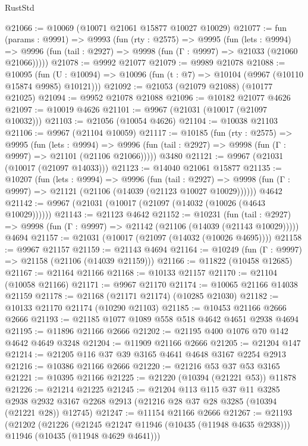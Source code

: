 \begin{lexlean}{RustStd}
\begin{coremodule}
@21066 := @10069 (@10071 @21061 @15877 @10027 @10029)
@21077 := fun (params : @9991) =>
  @9993
    (fun (rty : @2575) =>
    @9995
      (fun (lets : @9994) =>
      @9996 (fun (tail : @2927) => @9998 (fun (Γ : @9997) => @21033 (@21060 @21066)))))
@21078 := @9992 @21077
@21079 := @9989 @21078
@21088 := @10095
    (fun (U : @10094) => @10096 (fun (t : @7) => @10104 (@9967 (@10110 @15874 @9985) @10121)))
@21092 := @21053 (@21079 @21088) (@10177 @21025)
@21094 := @9952 @21078 @21088
@21096 := @10182 @21077 @4626
@21097 := @10019 @4626
@21101 := @9967 (@21031 (@10017 (@21097 @10032)))
@21103 := @21056 (@10054 @4626)
@21104 := @10038 @21103
@21106 := @9967 (@21104 @10059)
@21117 := @10185
    (fun (rty : @2575) =>
    @9995
      (fun (lets : @9994) =>
      @9996 (fun (tail : @2927) => @9998 (fun (Γ : @9997) => @21101 (@21106 @21066)))))
    @3480
@21121 := @9967 (@21031 (@10017 (@21097 @14033)))
@21123 := @14040 @21061 @15877
@21135 := @10207
    (fun (lets : @9994) =>
    @9996
      (fun (tail : @2927) =>
      @9998 (fun (Γ : @9997) => @21121 (@21106 (@14039 (@21123 @10027 @10029))))))
    @4642
@21142 := @9967 (@21031 (@10017 (@21097 (@14032 (@10026 (@4643 @10029))))))
@21143 := @21123 @4642
@21152 := @10231
    (fun (tail : @2927) => @9998 (fun (Γ : @9997) => @21142 (@21106 (@14039 (@21143 @10029)))))
    @4694
@21157 := @21031 (@10017 (@21097 (@14032 (@10026 @4695))))
@21158 := @9967 @21157
@21159 := @21143 @4694
@21164 := @10249 (fun (Γ : @9997) => @21158 (@21106 (@14039 @21159)))
@21166 := @11822 (@10458 @12685)
@21167 := @21164 @21166
@21168 := @10133 @21157
@21170 := @21104 (@10058 @21166)
@21171 := @9967 @21170
@21174 := @10065 @21166 @14038 @21159
@21178 := @21168 (@21171 @21174) (@10285 @21030)
@21182 := @10133 @21170 @21174 (@10290 @21103)
@21185 := @10453 @21166 @2666 @2666
@21193 := @21185 @1077 @1089 @558 @518 @4642 @4651 @2938 @4694
@21195 := @11896 @21166 @2666
@21202 := @21195 @400 @1076 @70 @142 @4642 @4649 @3248
@21204 := @11909 @21166 @2666
@21205 := @21204 @147
@21214 := @21205 @116 @37 @39 @3165 @4641 @4648 @3167 @2254 @2913
@21216 := @10386 @21166 @2666
@21220 := @21216 @53 @37 @53 @3165
@21221 := @10395 @21166
@21225 := @21220 (@10394 (@21221 @53)) @11878
@21226 := @21214 @21225
@21245 := @21204
    @113
    @115
    @37
    @11
    @3285
    @2938
    @2932
    @3167
    @2268
    @2913
    (@21216 @28 @37 @28 @3285 (@10394 (@21221 @28)) @12745)
@21247 := @11154 @21166 @2666
@21267 := @21193
    (@21202
      (@21226
        (@21245 @21247 @11946 (@10435 (@11948 @4635 @2938)))
        @11946
        (@10435 (@11948 @4629 @4641)))

\end{coremodule}
\end{lexlean}
